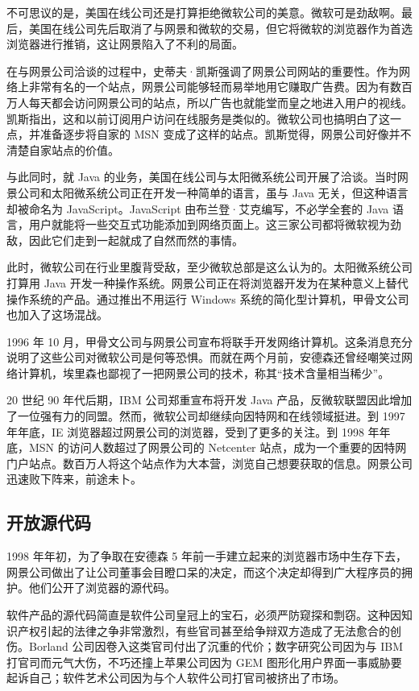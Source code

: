\documentclass[12pt,UTF8]{ctexbook}
\begin{document}
不可思议的是，美国在线公司还是打算拒绝微软公司的美意。微软可是劲敌啊。最后，美国在线公司先后取消了与网景和微软的交易，但它将微软的浏览器作为首选浏览器进行推销，这让网景陷入了不利的局面。

在与网景公司洽谈的过程中，史蒂夫·凯斯强调了网景公司网站的重要性。作为网络上非常有名的一个站点，网景公司能够轻而易举地用它赚取广告费。因为有数百万人每天都会访问网景公司的站点，所以广告也就能堂而皇之地进入用户的视线。凯斯指出，这和以前订阅用户访问在线服务是类似的。微软公司也搞明白了这一点，并准备逐步将自家的 MSN 变成了这样的站点。凯斯觉得，网景公司好像并不清楚自家站点的价值。

与此同时，就 Java 的业务，美国在线公司与太阳微系统公司开展了洽谈。当时网景公司和太阳微系统公司正在开发一种简单的语言，虽与 Java 无关，但这种语言却被命名为 JavaScript。JavaScript 由布兰登·艾克编写，不必学全套的 Java 语言，用户就能将一些交互式功能添加到网络页面上。这三家公司都将微软视为劲敌，因此它们走到一起就成了自然而然的事情。

此时，微软公司在行业里腹背受敌，至少微软总部是这么认为的。太阳微系统公司打算用 Java 开发一种操作系统。网景公司正在将浏览器开发为在某种意义上替代操作系统的产品。通过推出不用运行 Windows 系统的简化型计算机，甲骨文公司也加入了这场混战。

1996 年 10 月，甲骨文公司与网景公司宣布将联手开发网络计算机。这条消息充分说明了这些公司对微软公司是何等恐惧。而就在两个月前，安德森还曾经嘲笑过网络计算机，埃里森也鄙视了一把网景公司的技术，称其“技术含量相当稀少”。

20 世纪 90 年代后期，IBM 公司郑重宣布将开发 Java 产品，反微软联盟因此增加了一位强有力的同盟。然而，微软公司却继续向因特网和在线领域挺进。到 1997 年年底，IE 浏览器超过网景公司的浏览器，受到了更多的关注。到 1998 年年底，MSN 的访问人数超过了网景公司的 Netcenter 站点，成为一个重要的因特网门户站点。数百万人将这个站点作为大本营，浏览自己想要获取的信息。网景公司迅速败下阵来，前途未卜。





\subsection{开放源代码}


1998 年年初，为了争取在安德森 5 年前一手建立起来的浏览器市场中生存下去，网景公司做出了让公司董事会目瞪口呆的决定，而这个决定却得到广大程序员的拥护。他们公开了浏览器的源代码。

软件产品的源代码简直是软件公司皇冠上的宝石，必须严防窥探和剽窃。这种因知识产权引起的法律之争非常激烈，有些官司甚至给争辩双方造成了无法愈合的创伤。Borland 公司因卷入这类官司付出了沉重的代价；数字研究公司因为与 IBM 打官司而元气大伤，不巧还撞上苹果公司因为 GEM 图形化用户界面一事威胁要起诉自己；软件艺术公司因为与个人软件公司打官司被挤出了市场。
\end{document}
